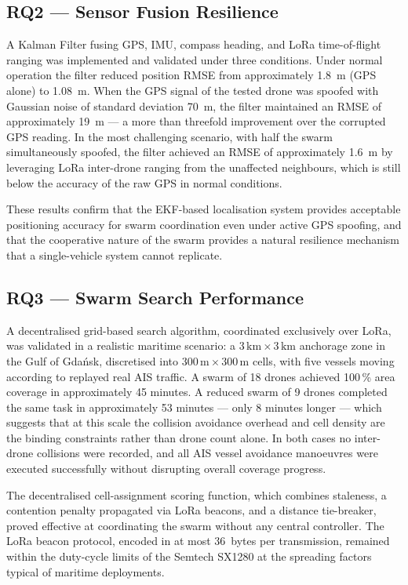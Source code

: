 \subsection*{RQ2 — Sensor Fusion Resilience}

A Kalman Filter fusing GPS, IMU, compass heading, and LoRa time-of-flight
ranging was implemented and validated under three conditions. Under normal
operation the filter reduced position RMSE from approximately 1.8~m (GPS
alone) to 1.08~m. When the GPS signal of the tested drone was spoofed with
Gaussian noise of standard deviation 70~m, the filter maintained an RMSE of
approximately 19~m — a more than threefold improvement over the corrupted
GPS reading. In the most challenging scenario, with half the swarm
simultaneously spoofed, the filter achieved an RMSE of approximately
1.6~m by leveraging LoRa inter-drone ranging from the unaffected neighbours,
which is still below the accuracy of the raw GPS in normal conditions.

These results confirm that the EKF-based localisation system provides
acceptable positioning accuracy for swarm coordination even under active GPS
spoofing, and that the cooperative nature of the swarm provides a natural
resilience mechanism that a single-vehicle system cannot replicate.

\subsection*{RQ3 — Swarm Search Performance}

A decentralised grid-based search algorithm, coordinated exclusively over
LoRa, was validated in a realistic maritime scenario: a $3\,\text{km} \times
3\,\text{km}$ anchorage zone in the Gulf of Gdańsk, discretised into
$300\,\text{m} \times 300\,\text{m}$ cells, with five vessels moving according
to replayed real AIS traffic. A swarm of 18 drones achieved 100\,\% area
coverage in approximately 45 minutes. A reduced swarm of 9 drones completed
the same task in approximately 53 minutes — only 8 minutes longer — which
suggests that at this scale the collision avoidance overhead and cell density
are the binding constraints rather than drone count alone. In both cases no
inter-drone collisions were recorded, and all AIS vessel avoidance manoeuvres
were executed successfully without disrupting overall coverage progress.

The decentralised cell-assignment scoring function, which combines staleness,
a contention penalty propagated via LoRa beacons, and a distance
tie-breaker, proved effective at coordinating the swarm without any central
controller. The LoRa beacon protocol, encoded in at most 36~bytes per
transmission, remained within the duty-cycle limits of the Semtech SX1280 at
the spreading factors typical of maritime deployments.

